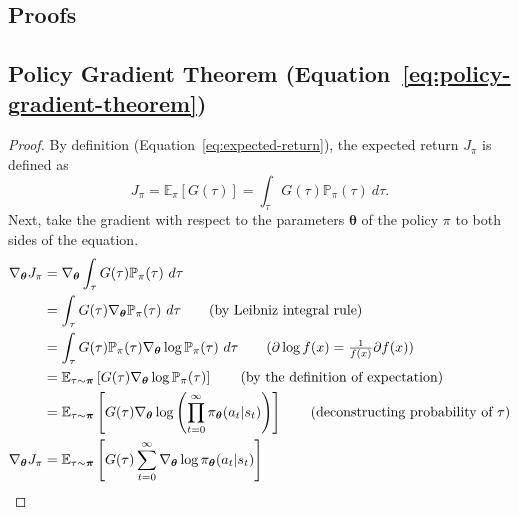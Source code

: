 \documentclass[12pt]{report}
\theoremstyle{definition}
\theoremstyle{remark}
\begin{document}
\begin{appendices}
\chapter{Proofs}
\section{Policy Gradient Theorem (Equation~\ref{eq:policy-gradient-theorem})}\label{sec:policy-gradient-theorem-proof}
\begin{proof}
    By definition (Equation~\ref{eq:expected-return}), the expected return $J_\pi$ is defined as
    \begin{equation*}
        J_\pi = \mathbb{E}_\pi[G(\tau)] = \int_{\tau} G(\tau)\mathbb{P}_{\pi}(\tau)\ d\tau.
    \end{equation*}
    Next, take the gradient with respect to the parameters $\boldsymbol{\theta}$ of the policy $\pi$ to both sides of the equation.
    \begin{align*}
        \nabla_{\boldsymbol{\theta}} J_\pi &= \nabla_{\boldsymbol{\theta}} \int_{\tau} G(\tau)\mathbb{P}_{\pi}(\tau)\ d\tau \\
        &= \int_{\tau} G(\tau) \nabla_{\boldsymbol{\theta}} \mathbb{P}_{\pi}(\tau)\ d\tau \tag{by Leibniz integral rule} \\
        &= \int_{\tau} G(\tau) \mathbb{P}_{\pi}(\tau) \nabla_{\boldsymbol{\theta}} \log \mathbb{P}_{\pi}(\tau)\ d\tau \tag{$\partial \log f(x) = \frac{1}{f(x)}\partial f(x)$} \\
        &= \mathbb{E}_{\tau\sim\boldsymbol{\pi}}\left[G(\tau) \nabla_{\boldsymbol{\theta}} \log \mathbb{P}_{\pi}(\tau)\right] \tag{by the definition of expectation} \\
        &= \mathbb{E}_{\tau\sim\boldsymbol{\pi}}\left[G(\tau) \nabla_{\boldsymbol{\theta}} \log \left(\prod_{t=0}^{\infty} \pi_{\boldsymbol{\theta}}(a_t | s_t)\right)\right] \tag{deconstructing probability of $\tau$} \\
        \nabla_{\boldsymbol{\theta}} J_\pi &= \mathbb{E}_{\tau\sim\boldsymbol{\pi}}\left[G(\tau) \sum_{t=0}^{\infty} \nabla_{\boldsymbol{\theta}} \log \pi_{\boldsymbol{\theta}}(a_t | s_t)\right]
    \end{align*}
\end{proof}


\end{appendices}
\end{document}
